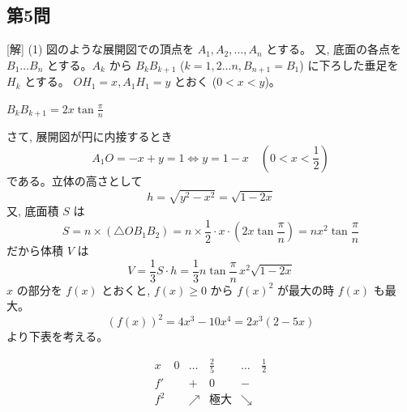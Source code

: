 \documentclass[../main.tex]{subfiles}
\begin{document}
\begin{center}
\end{center}

\subsection*{第5問}

[解] (1) 図のような展開図での頂点を $A_1, A_2, \dots, A_n$ とする。
又, 底面の各点を $B_1 \dots B_n$ とする。$A_k$ から $B_k B_{k+1}$ ($k=1, 2 \dots n, B_{n+1} = B_1$) に下ろした垂足を $H_k$ とする。
$OH_1 = x, A_1 H_1 = y$ とおく ($0 < x < y$)。

$B_k B_{k+1} = 2x \tan \frac{\pi}{n}$

さて, 展開図が円に内接するとき
\[
  A_1 O = -x + y = 1 \iff y = 1 - x \quad \left(0 < x < \frac{1}{2}\right)
\]
である。立体の高さとして
\[
  h = \sqrt{y^2 - x^2} = \sqrt{1 - 2x}
\]
又, 底面積 $S$ は
\[
  S = n \times (\triangle O B_1 B_2) = n \times \frac{1}{2} \cdot x \cdot \left(2x \tan\frac{\pi}{n}\right) = n x^2 \tan\frac{\pi}{n}
\]
だから体積 $V$ は
\[
  V = \frac{1}{3} S \cdot h = \frac{1}{3} n \tan\frac{\pi}{n} \, x^2 \sqrt{1 - 2x}
\]
$x$ の部分を $f(x)$ とおくと, $f(x) \ge 0$ から $f(x)^2$ が最大の時 $f(x)$ も最大。
\[
  (f(x))^2 = 4x^3 - 10x^4 = 2x^3 (2 - 5x)
\]
より下表を考える。

\[
  \begin{array}{c|c|c|c|c|c}
    x & 0 & \dots & \frac{2}{5} & \dots & \frac{1}{2} \\ \hline
    f' & & + & 0 & - & \\ \hline
    f^2 & & \nearrow & \text{極大} & \searrow &
  \end{array}
\]
\end{document}

